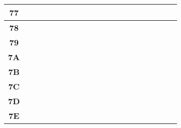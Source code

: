 \begin{table}[H]
\begin{tabular}{|Sc|Sc|Sc|Sc|Sc|Sc|Sc|Sc|Sc|Sc|}
\textbf{77} &  &  &  &  &  &  &  &  &  \\ \hline
\textbf{78} &  &  &  &  &  &  &  &  &  \\ \hline
\textbf{79} &  &  &  &  &  &  &  &  &  \\ \hline
\textbf{7A} &  &  &  &  &  &  &  &  &  \\ \hline
\textbf{7B} &  &  &  &  &  &  &  &  &  \\ \hline
\textbf{7C} &  &  &  &  &  &  &  &  &  \\ \hline
\textbf{7D} &  &  &  &  &  &  &  &  &  \\ \hline
\textbf{7E} &  &  &  &  &  &  &  &  &  \\ \hline
\end{tabular}
\end{table}

